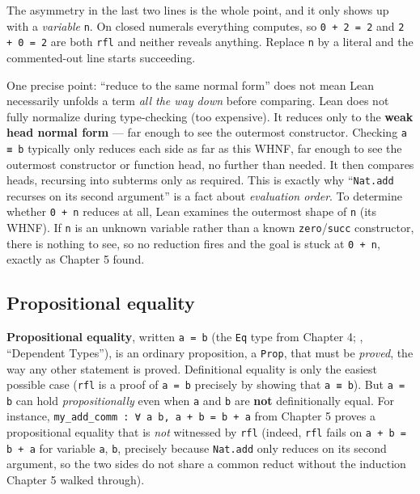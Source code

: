 The asymmetry in the last two lines is the whole point, and it only shows up with a \emph{variable} \texttt{n}. On closed numerals everything computes, so \texttt{0 + 2 = 2} and \texttt{2 + 0 = 2} are both \texttt{rfl} and neither reveals anything. Replace \texttt{n} by a literal and the commented-out line starts succeeding.

One precise point: ``reduce to the same normal form'' does not mean Lean necessarily unfolds a term \emph{all the way down} before comparing. Lean does not fully normalize during type-checking (too expensive). It reduces only to the \textbf{weak head normal form} --- far enough to see the outermost constructor. Checking \texttt{a ≡ b} typically only reduces each side as far as this WHNF, far enough to see the outermost constructor or function head, no further than needed. It then compares heads, recursing into subterms only as required. This is exactly why ``\texttt{Nat.add} recurses on its second argument'' is a fact about \emph{evaluation order}. To determine whether \texttt{0 + n} reduces at all, Lean examines the outermost shape of \texttt{n} (its WHNF). If \texttt{n} is an unknown variable rather than a known \texttt{zero}/\texttt{succ} constructor, there is nothing to see, so no reduction fires and the goal is stuck at \texttt{0 + n}, exactly as Chapter 5 found.

\subsection{Propositional equality}\label{sec:06-rigor-check:04-defeq-vs-propeq:3}

\textbf{Propositional equality}, written \texttt{a = b} (the \texttt{Eq} type from Chapter 4; \cite{TPIL4}, ``Dependent Types''), is an ordinary proposition, a \texttt{Prop}, that must be \emph{proved}, the way any other statement is proved. Definitional equality is only the easiest possible case (\texttt{rfl} is a proof of \texttt{a = b} precisely by showing that \texttt{a ≡ b}). But \texttt{a = b} can hold \emph{propositionally} even when \texttt{a} and \texttt{b} are \textbf{not} definitionally equal. For instance, \texttt{my\_\allowbreak{}add\_\allowbreak{}comm : ∀ a b, a + b = b + a} from Chapter 5 proves a propositional equality that is \emph{not} witnessed by \texttt{rfl} (indeed, \texttt{rfl} fails on \texttt{a + b = b + a} for variable \texttt{a}, \texttt{b}, precisely because \texttt{Nat.add} only reduces on its second argument, so the two sides do not share a common reduct without the induction Chapter 5 walked through).

